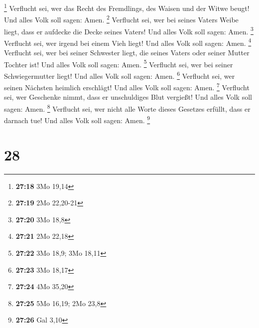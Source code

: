 \footnote{\textbf{27:18} 3Mo 19,14}  Verflucht sei, wer
das Recht des Fremdlings, des Waisen und der Witwe beugt! Und alles Volk
soll sagen: Amen. \footnote{\textbf{27:19} 2Mo 22,20-21} 
Verflucht sei, wer bei seines Vaters Weibe liegt, dass er aufdecke die
Decke seines Vaters! Und alles Volk soll sagen: Amen. \footnote{\textbf{27:20}
  3Mo 18,8}  Verflucht sei, wer irgend bei einem Vieh
liegt! Und alles Volk soll sagen: Amen. \footnote{\textbf{27:21} 2Mo
  22,18}  Verflucht sei, wer bei seiner Schwester liegt,
die seines Vaters oder seiner Mutter Tochter ist! Und alles Volk soll
sagen: Amen. \footnote{\textbf{27:22} 3Mo 18,9; 3Mo 18,11}
 Verflucht sei, wer bei seiner Schwiegermutter liegt! Und
alles Volk soll sagen: Amen. \footnote{\textbf{27:23} 3Mo 18,17}
 Verflucht sei, wer seinen Nächsten heimlich erschlägt!
Und alles Volk soll sagen: Amen. \footnote{\textbf{27:24} 4Mo 35,20}
 Verflucht sei, wer Geschenke nimmt, dass er unschuldiges
Blut vergießt! Und alles Volk soll sagen: Amen. \footnote{\textbf{27:25}
  5Mo 16,19; 2Mo 23,8}  Verflucht sei, wer nicht alle
Worte dieses Gesetzes erfüllt, dass er darnach tue! Und alles Volk soll
sagen: Amen. \footnote{\textbf{27:26} Gal 3,10}

\hypertarget{section-27}{%
\section{28}\label{section-27}}

